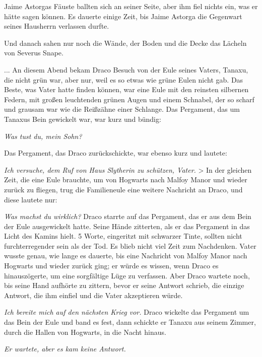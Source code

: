 Jaime Astorgas Fäuste ballten sich an seiner Seite, aber ihm fiel nichts ein,
was er hätte sagen können. Es dauerte einige Zeit, bis Jaime Astorga die
Gegenwart seines Hausherrn verlassen durfte.

Und danach sahen nur noch die Wände, der Boden und die Decke das Lächeln von
Severus Snape.

... An diesem Abend bekam Draco Besuch von der Eule seines Vaters, Tanaxu, die
nicht grün war, aber nur, weil es so etwas wie grüne Eulen nicht gab. Das Beste,
was Vater hatte finden können, war eine Eule mit den reinsten silbernen Federn,
mit großen leuchtenden grünen Augen und einem Schnabel, der so scharf und
grausam war wie die Reißzähne einer Schlange. Das Pergament, das um Tanaxus Bein
gewickelt war, war kurz und bündig:

\emph{Was tust du, mein Sohn?}

Das Pergament, das Draco zurückschickte, war ebenso kurz und lautete:\emph{}

\emph{Ich versuche, dem Ruf von Haus
Slytherin zu schützen, Vater.}    >
In der gleichen Zeit, die eine Eule brauchte, um von Hogwarts nach Malfoy Manor
und wieder zurück zu fliegen, trug die Familieneule eine weitere Nachricht an
Draco, und diese lautete nur:

\emph{Was machst du wirklich?} Draco starrte auf das Pergament, das er aus dem
Bein der Eule ausgewickelt hatte. Seine Hände zitterten, als er das Pergament in
das Licht des Kamins hielt. 5 Worte, eingeritzt mit schwarzer Tinte, sollten
nicht furchterregender sein als der Tod. Es blieb nicht viel Zeit zum
Nachdenken. Vater wusste genau, wie lange es dauerte, bis eine Nachricht von
Malfoy Manor nach Hogwarts und wieder zurück ging; er würde es wissen, wenn
Draco es hinauszögerte, um eine sorgfältige Lüge zu verfassen. Aber Draco
wartete noch, bis seine Hand aufhörte zu zittern, bevor er seine Antwort
schrieb, die einzige Antwort, die ihm einfiel und die Vater akzeptieren würde.

\emph{Ich bereite mich auf den nächsten Krieg vor.} Draco wickelte das Pergament
um das Bein der Eule und band es fest, dann schickte er Tanaxu aus seinem
Zimmer, durch die Hallen von Hogwarts, in die Nacht hinaus.

\emph{Er wartete, aber es kam keine Antwort.}

